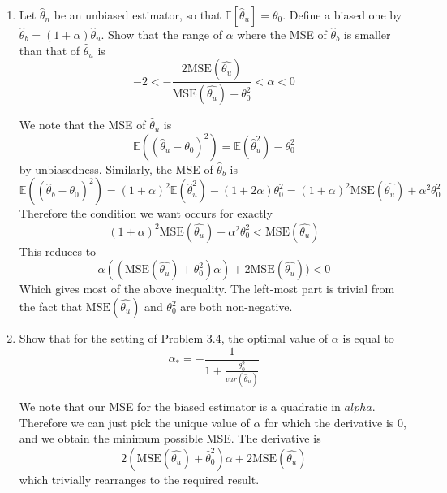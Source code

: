 \documentclass{article}
\newcommand{\chapternumber}{3}
\newenvironment{QandA}{\begin{enumerate}[label=\chapternumber.\arabic*]\bfseries\boldmath}
	{\end{enumerate}}
\newenvironment{answered}{\par\bigskip\normalfont\unboldmath}{}
\begin{document}
\begin{QandA}
		\item Let $\hat{\theta}_n$ be an unbiased estimator, so that $\mathbb{E}[\hat{\theta}_u]=\theta_0$. Define a biased one by $\hat{\theta}_b=(1+\alpha)\hat{\theta}_u$. Show that the range of $\alpha$ where the MSE of $\hat{\theta}_b$ is smaller than that of $\hat{\theta}_u$ is
		\[-2<-\frac{2\text{MSE}(\hat{\theta_u})}{\text{MSE}(\hat{\theta_u})+\theta_0^2}<\alpha<0\]
		\begin{answered}
			We note that the MSE of $\hat{\theta}_u$ is 
			\[\mathbb{E}((\hat{\theta}_u-\theta_0)^2)=\mathbb{E}(\hat{\theta}_u^2)-\theta_0^2\]
			by unbiasedness. Similarly, the MSE of $\hat{\theta}_b$ is
			\[\mathbb{E}((\hat{\theta}_b-\theta_0)^2)=(1+\alpha)^2\mathbb{E}(\hat{\theta}_u^2)-(1+2\alpha)\theta_0^2=(1+\alpha)^2\text{MSE}(\hat{\theta_u})+\alpha^2\theta_0^2\]
			Therefore the condition we want occurs for exactly
			\[(1+\alpha)^2\text{MSE}(\hat{\theta_u})-\alpha^2\theta_0^2<\text{MSE}(\hat{\theta_u})\]
			This reduces to
			\[\alpha((\text{MSE}(\hat{\theta_u})+\theta_0^2)\alpha)+2\text{MSE}(\hat{\theta_u}))<0\]
			Which gives most of the above inequality. The left-most part is trivial from the fact that $\text{MSE}(\hat{\theta_u})$ and $\theta_0^2$ are both non-negative.
		\end{answered}
		\item Show that for the setting of Problem 3.4, the optimal value of $\alpha$ is equal to 
		\[\alpha_*=-\frac{1}{1+\frac{\theta_0^2}{var(\hat{\theta}_u)}}\]
		\begin{answered}
			We note that our MSE for the biased estimator is a quadratic in $alpha$. Therefore we can just pick the unique value of $\alpha$ for which the derivative is 0, and we obtain the minimum possible MSE. The derivative is
			\[2(\text{MSE}(\hat{\theta_u})+\hat{\theta}_0^2)\alpha+2\text{MSE}(\hat{\theta_u})\]
			which trivially rearranges to the required result.
		\end{answered}
	\end{QandA}
	
\end{document}
